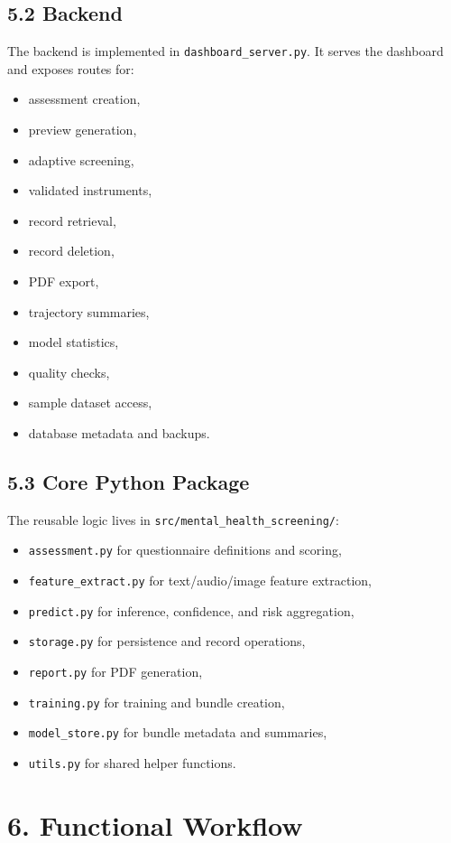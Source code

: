 \documentclass[11pt]{article}
\begin{document}
\subsection{5.2 Backend}
The backend is implemented in \texttt{dashboard\_server.py}. It serves the dashboard and exposes routes for:
\begin{itemize}[leftmargin=*]
  \item assessment creation,
  \item preview generation,
  \item adaptive screening,
  \item validated instruments,
  \item record retrieval,
  \item record deletion,
  \item PDF export,
  \item trajectory summaries,
  \item model statistics,
  \item quality checks,
  \item sample dataset access,
  \item database metadata and backups.
\end{itemize}

\subsection{5.3 Core Python Package}
The reusable logic lives in \texttt{src/mental\_health\_screening/}:
\begin{itemize}[leftmargin=*]
  \item \texttt{assessment.py} for questionnaire definitions and scoring,
  \item \texttt{feature\_extract.py} for text/audio/image feature extraction,
  \item \texttt{predict.py} for inference, confidence, and risk aggregation,
  \item \texttt{storage.py} for persistence and record operations,
  \item \texttt{report.py} for PDF generation,
  \item \texttt{training.py} for training and bundle creation,
  \item \texttt{model\_store.py} for bundle metadata and summaries,
  \item \texttt{utils.py} for shared helper functions.
\end{itemize}

\section{6. Functional Workflow}
\end{document}
